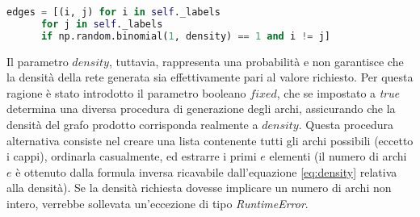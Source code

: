   \begin{lstlisting}[language=python]
    edges = [(i, j) for i in self._labels 
      for j in self._labels 
      if np.random.binomial(1, density) == 1 and i != j]
  \end{lstlisting}

  Il parametro $density$, tuttavia, rappresenta una probabilità e non garantisce che la
  densità della rete generata sia effettivamente pari al valore richiesto. Per questa 
  ragione è stato introdotto il parametro booleano $fixed$, che se impostato a \textit{true}
  determina una diversa procedura di generazione degli archi, assicurando che la densità
  del grafo prodotto corrisponda realmente a $density$. Questa procedura alternativa
  consiste nel creare una lista contenente tutti gli archi possibili (eccetto i cappi),
  ordinarla casualmente, ed estrarre i primi $e$ elementi (il numero di archi $e$ è ottenuto 
  dalla formula inversa ricavabile dall'equazione \eqref{eq:density} relativa alla densità).
  Se la densità richiesta dovesse implicare un numero di archi non intero, verrebbe sollevata un'eccezione
  di tipo \textit{RuntimeError}.


